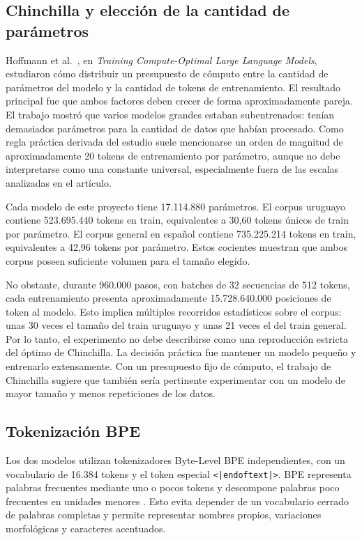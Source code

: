 \documentclass[11pt,a4paper]{article}
\begin{document}
\subsection{Chinchilla y elección de la cantidad de parámetros}

Hoffmann et al.~\cite{hoffmann2022}, en \emph{Training Compute-Optimal Large
Language Models}, estudiaron cómo distribuir un presupuesto de cómputo entre la
cantidad de parámetros del modelo y la cantidad de tokens de entrenamiento. El
resultado principal fue que ambos factores deben crecer de forma aproximadamente
pareja. El trabajo mostró que varios modelos grandes estaban subentrenados:
tenían demasiados parámetros para la cantidad de datos que habían procesado.
Como regla práctica derivada del estudio suele mencionarse un orden de magnitud
de aproximadamente 20 tokens de entrenamiento por parámetro, aunque no debe
interpretarse como una constante universal, especialmente fuera de las escalas
analizadas en el artículo.

Cada modelo de este proyecto tiene 17.114.880 parámetros. El corpus uruguayo
contiene 523.695.440 tokens en train, equivalentes a 30,60 tokens únicos de
train por parámetro. El corpus general en español contiene 735.225.214 tokens
en train, equivalentes a 42,96 tokens por parámetro. Estos cocientes muestran
que ambos corpus poseen suficiente volumen para el tamaño elegido.

No obstante, durante 960.000 pasos, con batches de 32 secuencias de 512 tokens,
cada entrenamiento presenta aproximadamente 15.728.640.000 posiciones de token
al modelo. Esto implica múltiples recorridos estadísticos sobre el corpus: unas
30 veces el tamaño del train uruguayo y unas 21 veces el del train general. Por
lo tanto, el experimento no debe describirse como una reproducción estricta del
óptimo de Chinchilla. La decisión práctica fue mantener un modelo pequeño y
entrenarlo extensamente. Con un presupuesto fijo de cómputo, el trabajo de
Chinchilla sugiere que también sería pertinente experimentar con un modelo de
mayor tamaño y menos repeticiones de los datos.


\subsection{Tokenización BPE}

Los dos modelos utilizan tokenizadores Byte-Level BPE independientes, con un
vocabulario de 16.384 tokens y el token especial
\texttt{<|endoftext|>}. BPE representa palabras frecuentes mediante uno o pocos
tokens y descompone palabras poco frecuentes en unidades menores
\cite{sennrich2016}. Esto evita depender de un vocabulario cerrado de palabras
completas y permite representar nombres propios, variaciones morfológicas y
caracteres acentuados.
\end{document}
